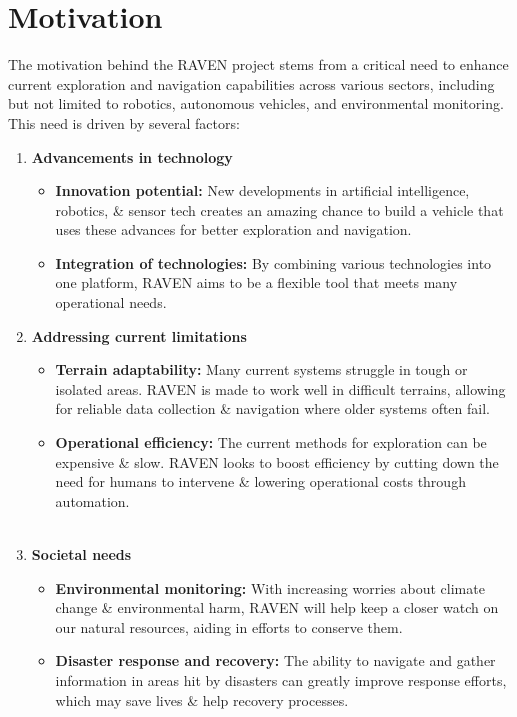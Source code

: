 \section{\fontsize{14}{16} Motivation} \label{sec:sec3}
{
	\fontsize{12}{14}
	The motivation behind the RAVEN project stems from a critical need to enhance current
	exploration and navigation capabilities across various sectors, including but not limited to
	robotics, autonomous vehicles, and environmental monitoring. This need is driven by several
	factors:
	\begin{enumerate}[label=\textbf{\arabic*}.]
		
		\item \textbf{Advancements in technology}
		\begin{itemize}
			\item \textbf{Innovation potential:} New developments in artificial intelligence, robotics, \& sensor tech creates an amazing chance to build a vehicle that uses these advances for better exploration and navigation.
			\item \textbf{Integration of technologies:} By combining various technologies into one platform, RAVEN aims to be a flexible tool that meets many operational needs.
		\end{itemize}
		
		\item \textbf{Addressing current limitations}
		\begin{itemize}
			\item \textbf{Terrain adaptability:} Many current systems struggle in tough or isolated areas. RAVEN is made to work well in difficult terrains, allowing for reliable data
			collection \& navigation where older systems often fail. 
			\item \textbf{Operational efficiency:} The current methods for exploration can be expensive \& slow. RAVEN looks to boost efficiency by cutting down the need for humans to intervene \& lowering operational costs through automation.\\ \\
		\end{itemize}
		
		\item \textbf{Societal needs}
		\begin{itemize}
			\item \textbf{Environmental monitoring:} With increasing worries about climate change \&
			environmental harm, RAVEN will help keep a closer watch on our natural resources,  aiding in efforts to conserve them. 
			\item \textbf{Disaster response and recovery:} The ability to navigate and gather information in areas hit by disasters can greatly improve response efforts, which may save lives \& help recovery processes.
		\end{itemize}
		

\end{enumerate}}
